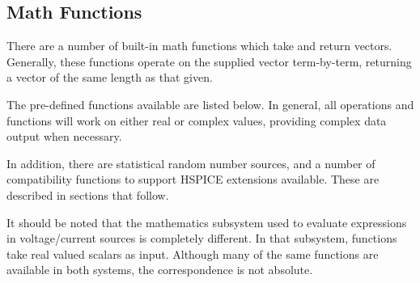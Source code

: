 \subsection{Math Functions}


There are a number of built-in math functions which take and return
vectors.  Generally, these functions operate on the supplied vector
term-by-term, returning a vector of the same length as that given.

The pre-defined functions available are listed below.  In general, all
operations and functions will work on either real or complex values,
providing complex data output when necessary.

In addition, there are statistical random number sources, and a number
of compatibility functions to support HSPICE extensions available. 
These are described in sections that follow.

It should be noted that the mathematics subsystem used to evaluate
expressions in voltage/current sources is completely different.  In
that subsystem, functions take real valued scalars as input.  Although
many of the same functions are available in both systems, the
correspondence is not absolute.

\newcommand{\zzfmt}[1]{{\vt #1({\it vector\/})}}
\newcommand{\zzfmtt}[1]{{\vt #1({\it vector\_x\/}, {\it vector\_y\/})}}

